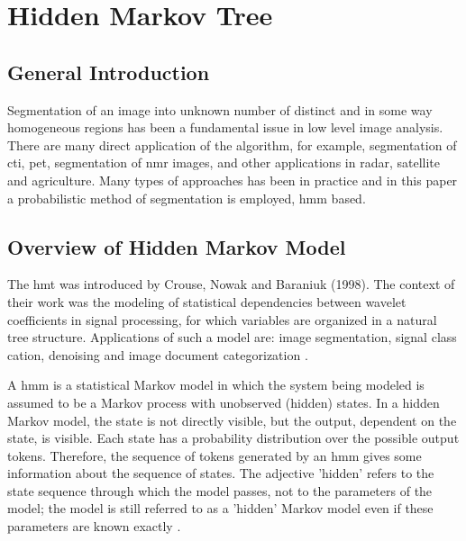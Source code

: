 \section{Hidden Markov Tree}
\subsection{General Introduction}
Segmentation of an image into unknown number of distinct and in some way homogeneous regions has been a fundamental issue in low level image analysis. There are many direct application of the algorithm, for example, segmentation of \gls{cti}, \gls{pet}, segmentation of \gls{nmr} images, and other applications in radar, satellite and agriculture. Many types of approaches has been in practice and in this paper a probabilistic method of segmentation is employed, \gls{hmm} based.

\subsection{Overview of Hidden Markov Model}
The \gls{hmt} was introduced by Crouse, Nowak and Baraniuk (1998). The context of their work was the modeling of statistical dependencies between wavelet coefficients in signal processing, for which variables are organized in a natural tree structure. Applications of such a model are: image segmentation, signal class cation, denoising and image document categorization \cite{durand2001statistical}.

A \gls{hmm} is a statistical Markov model in which the system being modeled is assumed to be a Markov process with unobserved (hidden) states. In a hidden Markov model, the state is not directly visible, but the output, dependent on the state, is visible. Each state has a probability distribution over the possible output tokens. Therefore, the sequence of tokens generated by an \gls{hmm} gives some information about the sequence of states. The adjective 'hidden' refers to the state sequence through which the model passes, not to the parameters of the model; the model is still referred to as a 'hidden' Markov model even if these parameters are known exactly \cite{jezicagent}. 


